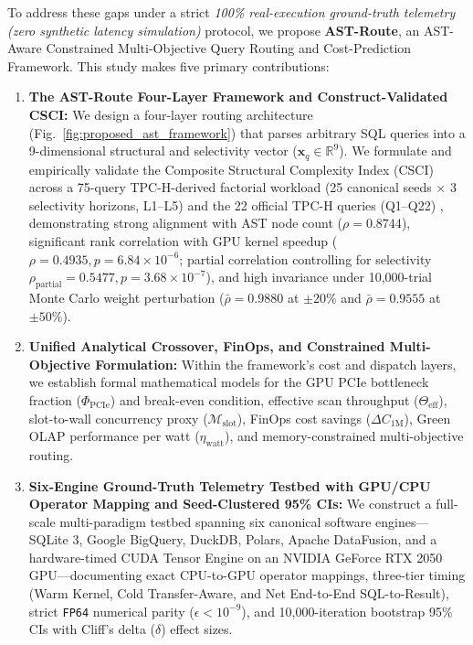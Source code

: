 \documentclass[10pt,a4paper]{article}
\begin{document}
To address these gaps under a strict \emph{100\% real-execution ground-truth telemetry (zero synthetic latency simulation)} protocol, we propose \textbf{AST-Route}, an AST-Aware Constrained Multi-Objective Query Routing and Cost-Prediction Framework. This study makes five primary contributions:
\begin{enumerate}[leftmargin=1.5em,itemsep=2pt]
    \item \textbf{The AST-Route Four-Layer Framework and Construct-Validated CSCI:} We design a four-layer routing architecture (Fig.~\ref{fig:proposed_ast_framework}) that parses arbitrary SQL queries into a 9-dimensional structural and selectivity vector ($\mathbf{x}_q \in \mathbb{R}^9$). We formulate and empirically validate the Composite Structural Complexity Index ($\text{CSCI}$) across a 75-query TPC-H-derived factorial workload (25 canonical seeds $\times$ 3 selectivity horizons, L1--L5) and the 22 official TPC-H queries (Q1--Q22) \cite{tpc2022tpch}, demonstrating strong alignment with AST node count ($\rho=0.8744$), significant rank correlation with GPU kernel speedup ($\rho=0.4935, p=6.84\times 10^{-6}$; partial correlation controlling for selectivity $\rho_{\text{partial}}=0.5477, p=3.68\times 10^{-7}$), and high invariance under 10,000-trial Monte Carlo weight perturbation ($\bar{\rho}=0.9880$ at $\pm 20\%$ and $\bar{\rho}=0.9555$ at $\pm 50\%$).
    \item \textbf{Unified Analytical Crossover, FinOps, and Constrained Multi-Objective Formulation:} Within the framework's cost and dispatch layers, we establish formal mathematical models for the GPU PCIe bottleneck fraction ($\Phi_{\text{PCIe}}$) and break-even condition, effective scan throughput ($\Theta_{\text{eff}}$), slot-to-wall concurrency proxy ($\mathcal{M}_{\text{slot}}$), FinOps cost savings ($\Delta C_{\text{1M}}$), Green OLAP performance per watt ($\eta_{\text{watt}}$), and memory-constrained multi-objective routing.
    \item \textbf{Six-Engine Ground-Truth Telemetry Testbed with GPU/CPU Operator Mapping and Seed-Clustered 95\% CIs:} We construct a full-scale multi-paradigm testbed spanning six canonical software engines---SQLite 3, Google BigQuery, DuckDB, Polars, Apache DataFusion, and a hardware-timed CUDA Tensor Engine on an NVIDIA GeForce RTX 2050 GPU---documenting exact CPU-to-GPU operator mappings, three-tier timing (Warm Kernel, Cold Transfer-Aware, and Net End-to-End SQL-to-Result), strict \texttt{FP64} numerical parity ($\epsilon < 10^{-9}$), and 10,000-iteration bootstrap 95\% CIs with Cliff's delta ($\delta$) effect sizes.

\end{enumerate}
\end{document}
